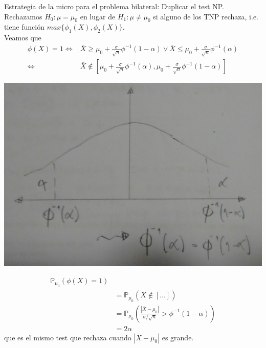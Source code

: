 \documentclass[10pt]{article}
\theoremstyle{plain}
\theoremstyle{definition}
\begin{document}
Estrategia de la micro para el problema bilateral: Duplicar el test NP.\\

Rechazamos $H_{0}:\mu=\mu_{0}$ en lugar de $H_{1}:\mu \not = \mu_{0}$ si alguno de los TNP rechaza, i.e. tiene función $max\{\phi_{1}(X),\phi_{2}(X)\}$.\\

Veamos que
\begin{align*}
\phi(X) = 1 \Leftrightarrow & \bar{X} \ge \mu_{0} + \frac{\sigma}{\sqrt{n}}\phi^{-1}(1-\alpha) \lor \bar{X} \le \mu_{0} + \frac{\sigma}{\sqrt{n}}\phi^{-1}(\alpha)\\
\Leftrightarrow & \bar{X} \not \in [\mu_{0} + \frac{\sigma}{\sqrt{n}}\phi^{-1}(\alpha), \mu_{0} + \frac{\sigma}{\sqrt{n}}\phi^{-1}(1-\alpha)]
\end{align*}
\begin{center}
\includegraphics[scale=0.1]{imagenes/micro.jpg}
\end{center}
\begin{align*}
\mathbb{P}_{\mu_{0}}(\phi(X)=1)&\\
&= \mathbb{P}_{\mu_{0}}(\bar{X}\not \in [\ldots])\\
&= \mathbb{P}_{\mu_{0}}\left(\frac{|\bar{X}-\mu_{0}|}{\sigma/\sqrt{n}}>\phi^{-1}(1-\alpha)\right)\\
&= 2\alpha
\end{align*}
que es el mismo test que rechaza cuando $|\bar{X}-\mu_{0}|$ es grande.
\end{document}
